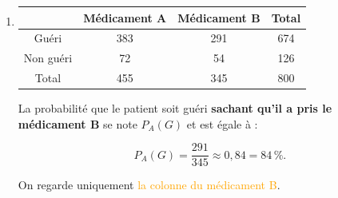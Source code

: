 \documentclass{article}
\theoremstyle{definition}
\begin{document}
\begin{enumerate}
\begin{enumerate}
        La probabilité que le patient ait pris le médicament A \textbf{sachant qu'il est guéri}
        se note $P_G(A)$ et est égale à :

        $$
        P_G(A) = \frac{383}{674} \approx 0{,}57 = 57\,\%.
        $$

        On regarde uniquement \textcolor{cyan}{la ligne des patients guéris}.

        \item
        \begin{center}
        \begin{tabular}{|c|c|c|c|}
        \hline
        & Médicament A & \cellcolor{orange!80}Médicament B & Total \\
        \hline
        Guéri & 383 & \cellcolor{orange!80}291 & 674 \\
        \hline
        Non guéri & 72 & \cellcolor{orange!80}54 & 126 \\
        \hline
        Total & 455 & \cellcolor{orange!80}345 & 800 \\
        \hline
        \end{tabular}
        \end{center}

        La probabilité que le patient soit guéri \textbf{sachant qu'il a pris le médicament B}
        se note $P_A(G)$ et est égale à :

        $$
        P_A(G) = \frac{291}{345} \approx 0{,}84 = 84\,\%.
        $$

        On regarde uniquement \textcolor{orange}{la colonne du médicament B}.
    \end{enumerate}
\end{enumerate}

\vfill
\end{document}
